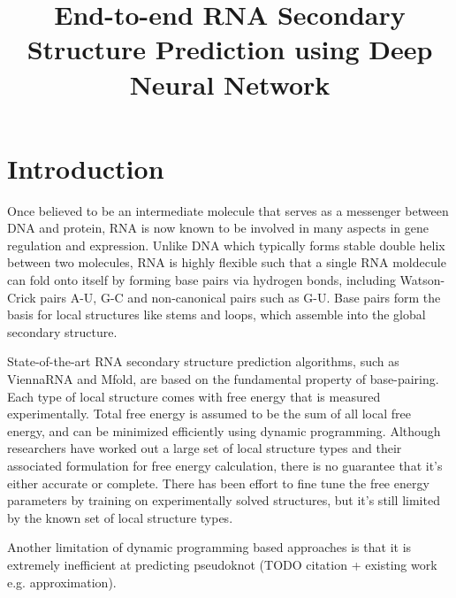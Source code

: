 \documentclass{article}
\title{End-to-end RNA Secondary Structure Prediction using Deep Neural Network}
\begin{document}
\maketitle



\section{Introduction}

Once believed to be an intermediate molecule that serves as a messenger between DNA and protein,
RNA is now known to be involved in many aspects in gene regulation and expression.
Unlike DNA which typically forms stable double helix between two molecules, RNA is highly flexible
such that a single RNA moldecule can fold onto itself by
forming base pairs via hydrogen bonds, including Watson-Crick pairs A-U,
G-C and non-canonical pairs such as G-U.
Base pairs form the basis for local structures like stems and loops,
which assemble into the global secondary structure.

State-of-the-art RNA secondary structure prediction algorithms,
such as ViennaRNA\cite{lorenz2011viennarna} and Mfold\cite{zuker2003mfold},
are based on the fundamental property of base-pairing.
Each type of local structure comes with free energy that is measured experimentally.
Total free energy is assumed to be the sum of all local free energy,
and can be minimized efficiently using dynamic programming.
Although researchers have worked out a large set of local structure types and
their associated formulation for free energy calculation,
there is no guarantee that it's either accurate or complete.
There has been effort to fine tune the free energy parameters by
training on experimentally solved structures\cite{andronescu2007efficient},
but it's still limited by the known set of local structure types.

Another limitation of dynamic programming based approaches is that
it is extremely inefficient at predicting pseudoknot (TODO citation + existing work e.g. approximation).


\end{document}

